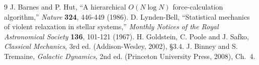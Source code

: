 \documentclass[12pt,a4paper]{article}
\begin{document}
\FloatBarrier
{}
\begin{thebibliography}{9}
     J. Barnes and P. Hut, ``A hierarchical $O(N\log N)$
    force-calculation algorithm,'' \textit{Nature} \textbf{324}, 446-449 (1986).
     D. Lynden-Bell, ``Statistical mechanics of violent
    relaxation in stellar systems,'' \textit{Monthly Notices of the Royal Astronomical
    Society} \textbf{136}, 101-121 (1967).
     H. Goldstein, C. Poole and J. Safko, \textit{Classical
    Mechanics}, 3rd ed. (Addison-Wesley, 2002), \S3.4.
     J. Binney and S. Tremaine, \textit{Galactic
    Dynamics}, 2nd ed. (Princeton University Press, 2008), Ch.~4.
\end{thebibliography}
\end{document}
